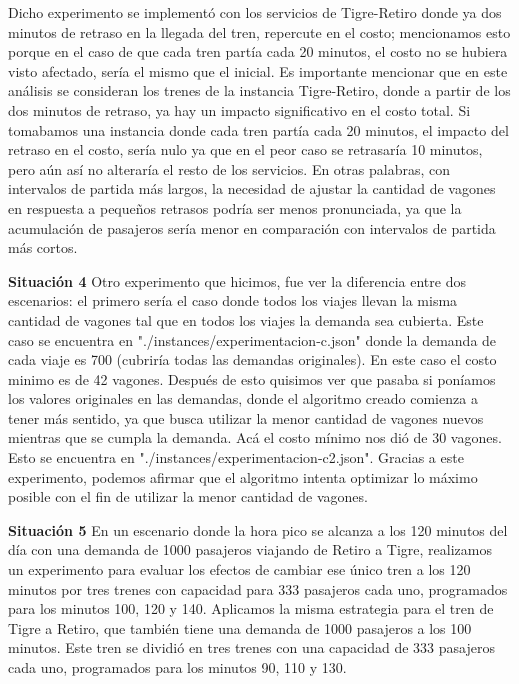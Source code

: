 \documentclass{article}
\begin{document}
        Dicho experimento se implementó con los servicios de Tigre-Retiro donde ya dos minutos de retraso en la llegada del tren, repercute en el costo; mencionamos esto porque en el caso de que cada tren partía cada 20 minutos, el costo no se hubiera visto afectado, sería el mismo que el inicial. 
        Es importante mencionar que en este análisis se consideran los trenes de la instancia Tigre-Retiro, donde a partir de los dos minutos de retraso, ya hay un impacto significativo en el costo total. Si tomabamos una instancia donde cada tren partía cada 20 minutos, el impacto del retraso en el costo, sería nulo ya que en el peor caso se retrasaría 10 minutos, pero aún así no alteraría el resto de los servicios. En otras palabras, con intervalos de partida más largos, la necesidad de ajustar la cantidad de vagones en respuesta a pequeños retrasos podría ser menos pronunciada, ya que la acumulación de pasajeros sería menor en comparación con intervalos de partida más cortos.
        \vspace{1cm}
        
\textbf{Situación 4}
\newline
    Otro experimento que hicimos, fue ver la diferencia entre dos escenarios: el primero sería el caso donde todos los viajes llevan la misma cantidad de vagones tal que en todos los viajes la demanda sea cubierta. Este caso se encuentra en "./instances/experimentacion-c.json" donde la demanda de cada viaje es 700 (cubriría todas las demandas originales). En este caso el costo minimo es de 42 vagones. 
    Después de esto quisimos ver que pasaba si poníamos los valores originales en las demandas, donde el algoritmo creado comienza a tener más sentido, ya que busca utilizar la menor cantidad de vagones nuevos mientras que se cumpla la demanda. Acá el costo mínimo nos dió de 30 vagones. Esto se encuentra en "./instances/experimentacion-c2.json". 
    Gracias a este experimento, podemos afirmar que el algoritmo intenta optimizar lo máximo posible con el fin de utilizar la menor cantidad de vagones.

\vspace{1cm}

\textbf{Situación 5}
\newline
    En un escenario donde la hora pico se alcanza a los 120 minutos del día con una demanda de 1000 pasajeros viajando de Retiro a Tigre, realizamos un experimento para evaluar los efectos de cambiar ese único tren a los 120 minutos por tres trenes con capacidad para 333 pasajeros cada uno, programados para los minutos 100, 120 y 140. Aplicamos la misma estrategia para el tren de Tigre a Retiro, que también tiene una demanda de 1000 pasajeros a los 100 minutos. Este tren se dividió en tres trenes con una capacidad de 333 pasajeros cada uno, programados para los minutos 90, 110 y 130. 
\end{document}
